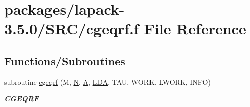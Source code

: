 \hypertarget{cgeqrf_8f}{}\section{packages/lapack-\/3.5.0/\+S\+R\+C/cgeqrf.f File Reference}
\label{cgeqrf_8f}
\subsection*{Functions/\+Subroutines}
\begin{DoxyCompactItemize}
\item 
subroutine \hyperlink{group__complexGEcomputational_ga333680795e2818318a1c6f6d1a503722}{cgeqrf} (M, \hyperlink{polmisc_8c_a0240ac851181b84ac374872dc5434ee4}{N}, \hyperlink{classA}{A}, \hyperlink{example__user_8c_ae946da542ce0db94dced19b2ecefd1aa}{L\+D\+A}, T\+A\+U, W\+O\+R\+K, L\+W\+O\+R\+K, I\+N\+F\+O)
\begin{DoxyCompactList}\small\item\em {\bfseries C\+G\+E\+Q\+R\+F} \end{DoxyCompactList}\end{DoxyCompactItemize}
